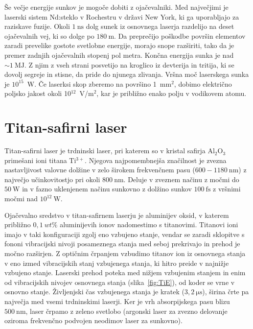 \begin{remark}
Še večje energije sunkov je mogoče dobiti z ojačevalniki. Med največjimi je
laserski sistem Nd:steklo v Rochestru v državi New York, ki ga uporabljajo
za raziskave fuzije. Okoli $1~\si{\nano\second}$ dolg sunek iz osnovnega laserja razdelijo na
deset ojačevalnih vej, ki so dolge po $180~\si{\metre}$. Da preprečijo poškodbe
površin elementov zaradi prevelike gostote svetlobne energije, morajo snope
razširiti, tako da je premer zadnjih ojačevalnih stopenj pol metra.
Končna energija sunka je nad $\sim 1~\si{\mega\joule}$. Z njim z vseh strani posvetijo na
kroglico iz devterija in tritija, ki se dovolj segreje in stisne, da pride
do njunega zlivanja. Vršna moč laserskega sunka je $10^{15}$~W. 
Če laserksi skop zberemo na površino 1~mm$^2$, dobimo električno poljsko jakost
okoli 10$^{12}$~V/m$^2$, kar je približno enako polju v vodikovem atomu.
\end{remark}

\section{Titan-safirni laser}
Titan-safirni laser je trdninski laser, pri katerem so v kristal safirja
Al$_2$O$_3$ primešani ioni titana Ti$^{3+}$. Njegova najpomembnejša značilnost je
zvezna nastavljivost valovne dolžine v zelo širokem frekvenčnem pasu 
($600-1180~\si{\nano\metre}$) z največjo učinkovitostjo pri okoli $800~\si{\nano\metre}$. Deluje
v zveznem načinu z močmi do $50~\si{\watt}$ in v fazno uklenjenem načinu sunkovno 
z dolžino sunkov $100~\si{\femto\second}$ z vršnimi močmi nad $10^{12}~\si{\watt}$. 

Ojačevalno sredstvo v titan-safirnem laserju je aluminijev oksid, v katerem 
približno $0,1~wt\%$ aluminijevih ionov nadomestimo s titanovimi. Titanovi ioni imajo 
v taki konfiguraciji zgolj eno vzbujeno stanje, vendar se zaradi sklopitve s fononi
vibracijski nivoji posameznega stanja med seboj prekrivajo in prehod je močno razširjen. 
Z optičnim črpanjem vzbudimo titanov ion iz osnovnega stanja v eno izmed vibracijskih 
stanj vzbujenega stanja, ki hitro preide v najnižje vzbujeno stanje. 
Laserski prehod poteka med nižjem vzbujenim stanjem in enim od vibracijskih 
nivojev osnovnega stanja (slika~\ref{fig:TiE}), od koder se vrne v osnovno stanje. Življenjski čas
vzbujenega stanja je kratek ($3,2~\si{\micro\second}$), širina črte pa največja med
vsemi trdninskimi laserji. Ker je vrh absorpijskega pasu blizu $500~\si{\nano\metre}$,
laser črpamo z zeleno svetlobo (argonski laser za zvezno delovanje oziroma
frekvenčno podvojen neodimov laser za sunkovno). 

